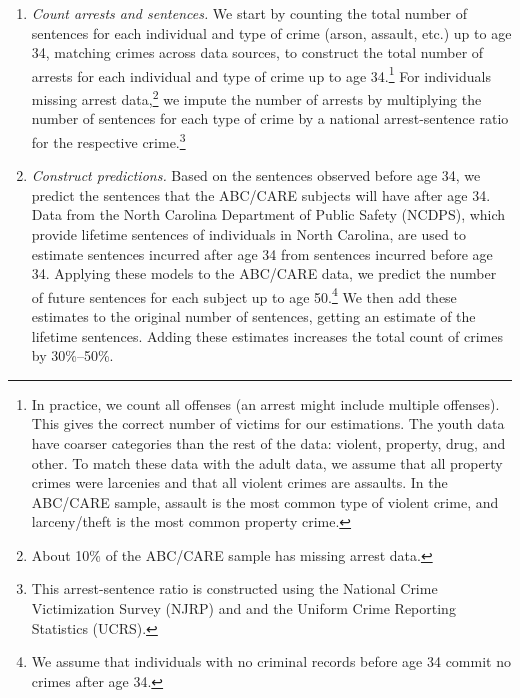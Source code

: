 \begin{enumerate}
\item \textit{Count arrests and sentences.} We start by counting the total number of sentences for each individual and type of crime (arson, assault, etc.) up to age 34, matching crimes across data sources, to construct the total number of  arrests for each individual and type of crime up to age 34.\footnote{In practice, we count all offenses (an arrest might include multiple offenses). This gives the correct number of victims for our estimations. The youth data have coarser categories than the rest of the data: violent, property, drug, and other. To match these data with the adult data, we assume that all property crimes were larcenies and that all violent crimes are assaults. In the ABC/CARE sample, assault is the most common type of violent crime, and larceny/theft is the most common property crime.} For individuals missing arrest data,\footnote{About 10\% of the ABC/CARE sample has missing arrest data.} we impute the number of arrests by multiplying the number of sentences for each type of crime by a national arrest-sentence ratio for the respective crime.\footnote{This arrest-sentence ratio is constructed using the National Crime Victimization Survey (NJRP) and and the Uniform Crime Reporting Statistics (UCRS).}

\item \textit{Construct predictions.} Based on the sentences observed before age 34, we predict the sentences that the ABC/CARE subjects will have after age 34. Data from the North Carolina Department of Public Safety (NCDPS), which provide lifetime sentences of individuals in North Carolina, are used to estimate sentences incurred after age 34 from sentences incurred before age 34. Applying these models to the ABC/CARE data, we predict the number of future sentences for each subject up to age 50.\footnote{We assume that individuals with no criminal records before age 34 commit no crimes after age 34.} We then add these estimates to the original number of sentences, getting an estimate of the lifetime sentences. Adding these estimates increases the total count of crimes by 30\%--50\%.


\end{enumerate}
